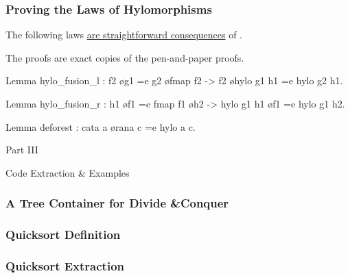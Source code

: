 \begin{frame}[fragile]
  \frametitle{Proving the Laws of Hylomorphisms}

The following  laws \ul{are straightforward
consequences} of .
\vspace{.4cm}

The proofs are exact copies of the pen-and-paper proofs.

  \begin{center}
  \begin{minipage}{.7\textwidth}
  \begin{bluebox}
  \begin{coqcode}
Lemma hylo_fusion_l
    : f2 \o g1 =e g2 \o fmap f2 ->
          f2 \o hylo g1 h1 =e hylo g2 h1.

Lemma hylo_fusion_r
    : h1 \o f1 =e fmap f1 \o h2 ->
          hylo g1 h1 \o f1 =e hylo g1 h2.

Lemma deforest : cata a \o rana c =e hylo a c.
  \end{coqcode}
  \end{bluebox}
  \end{minipage}
  \end{center}



\end{frame}

\begin{frame}
  \vfill
  \centering
  \begin{sticky}
    {\normalfont Part III}

    {\normalfont\Large Code Extraction \& Examples}
    \par%
  \end{sticky}
  \vfill
\end{frame}

\begin{frame}
  \frametitle{A Tree Container for Divide \&Conquer}
\end{frame}

\begin{frame}
  \frametitle{Quicksort Definition}
\end{frame}

\begin{frame}
  \frametitle{Quicksort Extraction}
\end{frame}

